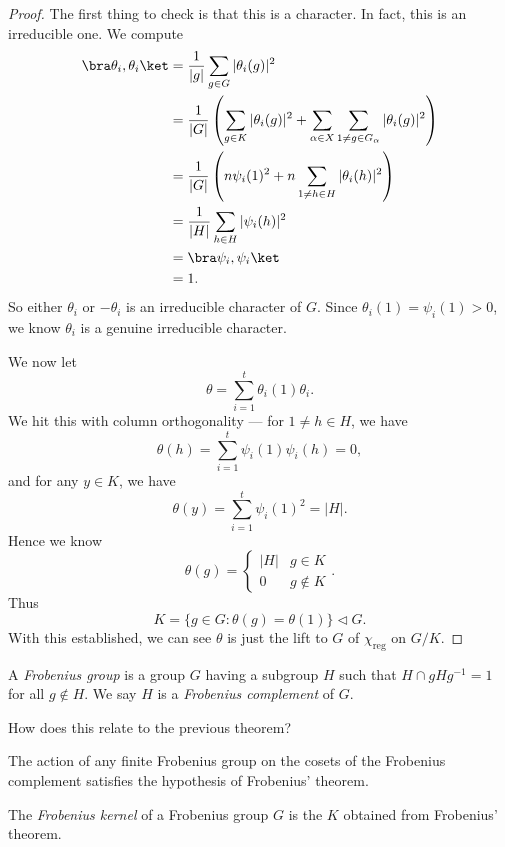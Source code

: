 \documentclass[a4paper]{article}
\begin{document}
\begin{proof}
  The first thing to check is that this is a character. In fact, this is an irreducible one. We compute
  \begin{align*}
    \bra \theta_i, \theta_i\ket &= \frac{1}{|g|} \sum_{g \in G} |\theta_i(g)|^2\\
    &= \frac{1}{|G|} \left(\sum_{g \in K} |\theta_i(g)|^2 + \sum_{\alpha \in X}\sum_{1 \not= g \in G_\alpha}|\theta_i(g)|^2\right)\\
    &= \frac{1}{|G|} \left(n \psi_i(1)^2 + n \sum_{1 \not= h \in H} |\theta_i (h)|^2\right)\\
    &= \frac{1}{|H|} \sum_{h \in H} |\psi_i(h)|^2\\
    &= \bra \psi_i, \psi_i \ket\\
    &= 1.
  \end{align*}
  So either $\theta_i$ or $-\theta_i$ is an irreducible character of $G$. Since $\theta_i(1) = \psi_i(1) > 0$, we know $\theta_i$ is a genuine irreducible character.

  We now let
  \[
    \theta = \sum_{i = 1}^t \theta_i(1) \theta_i.
  \]
  We hit this with column orthogonality --- for $1 \not= h \in H$, we have
  \[
    \theta(h) = \sum_{i = 1}^t \psi_i(1) \psi_i(h) = 0,
  \]
  and for any $y \in K$, we have
  \[
    \theta(y) = \sum_{i = 1}^t \psi_i(1)^2 = |H|.
  \]
  Hence we know
  \[
    \theta(g) =
    \begin{cases}
      |H| & g \in K\\
      0 & g \not\in K
    \end{cases}.
  \]
  Thus
  \[
    K = \{g \in G: \theta(g) = \theta(1)\} \lhd G.
  \]
  With this established, we can see $\theta$ is just the lift to $G$ of $\chi_{\mathrm{reg}}$ on $G/K$.
\end{proof}

\begin{defi}
  A \emph{Frobenius group} is a group $G$ having a subgroup $H$ such that $H\cap gHg^{-1} = 1$ for all $g \not\in H$. We say $H$ is a \emph{Frobenius complement} of $G$.
\end{defi}
How does this relate to the previous theorem?

\begin{prop}
  The action of any finite Frobenius group on the cosets of the Frobenius complement satisfies the hypothesis of Frobenius' theorem.
\end{prop}

\begin{defi}
  The \emph{Frobenius kernel} of a Frobenius group $G$ is the $K$ obtained from Frobenius' theorem.
\end{defi}
\end{document}
